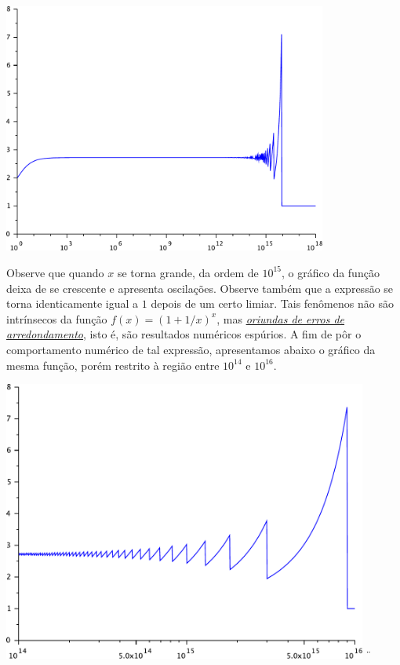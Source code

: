 \documentclass[main.tex]{subfiles}
\begin{document}
\begin{ex}
\includegraphics[width=0.8\textwidth]{./cap_aritmetica/pics/cancelamento_euler}

Observe que quando $x$ se torna grande, da ordem de $10^{15}$, o gráfico da função deixa de se crescente e apresenta oscilações.  Observe também que a expressão se torna identicamente igual a $1$ depois de um certo limiar. Tais fenômenos não são intrínsecos da função $f(x)=(1+1/x)^x$, mas \emph{\uline{oriundas de erros de arredondamento}}, isto é, são resultados numéricos espúrios. A fim de pôr o comportamento numérico de tal expressão, apresentamos abaixo o gráfico da mesma função, porém restrito à região entre $10^{14}$ e $10^{16}$.

\includegraphics[width=0.9\textwidth]{./cap_aritmetica/pics/cancelamento_euler2}
¨%
\end{ex}
\end{document}
